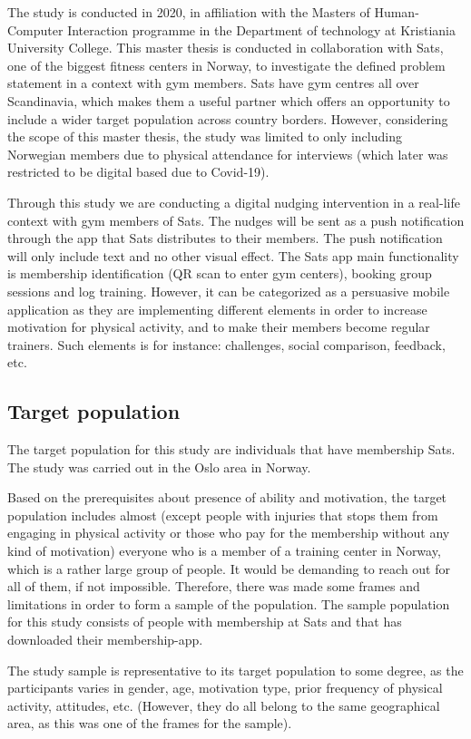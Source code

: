 The study is conducted in 2020, in affiliation with the Masters of Human-Computer Interaction programme in the Department of technology at Kristiania University College. This master thesis is conducted in collaboration with Sats, one of the biggest fitness centers in Norway, to investigate the defined problem statement in a context with gym members. Sats have gym centres all over Scandinavia, which makes them a useful partner which offers an opportunity to include a wider target population across country borders. However, considering the scope of this master thesis, the study was limited to only including Norwegian members due to physical attendance for interviews (which later was restricted to be digital based due to Covid-19). 

Through this study we are conducting a digital nudging intervention in a real-life context with gym members of Sats. The nudges will be sent as a push notification through the app that Sats distributes to their members. The push notification will only include text and no other visual effect. The Sats app main functionality is membership identification (QR scan to enter gym centers), booking group sessions and log training. However, it can be categorized as a persuasive mobile application as they are implementing different elements in order to increase motivation for physical activity, and to make their members become regular trainers. Such elements is for instance: challenges, social comparison, feedback, etc. 

\subsection{Target population }

The target population for this study are individuals that have membership Sats. The study was carried out in the Oslo area in Norway.  


Based on the prerequisites about presence of ability and motivation, the target population includes almost (except people with injuries that stops them from engaging in physical activity or those who pay for the membership without any kind of motivation) everyone who is a member of a training center in Norway, which is a rather large group of people. It would be demanding to reach out for all of them, if not impossible. Therefore, there was made some frames and limitations in order to form a sample of the population. The sample population for this study consists of people with membership at Sats and that has downloaded their membership-app. 
 
The study sample is representative to its target population to some degree, as the participants varies in gender, age, motivation type, prior frequency of physical activity, attitudes, etc. (However, they do all belong to the same geographical area, as this was one of the frames for the sample).




